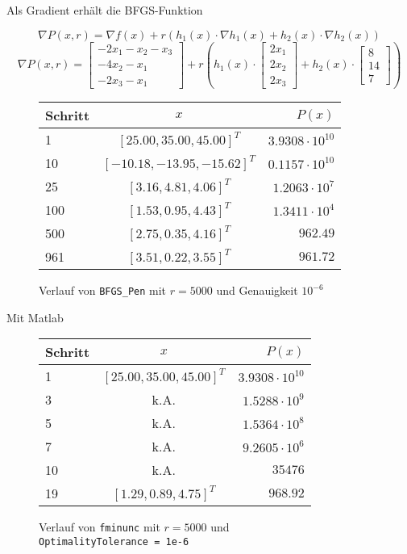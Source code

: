 \documentclass[a4paper, 12pt]{report}
\begin{document}
Als Gradient erhält die BFGS-Funktion

$$\nabla P(x, r) = \nabla f(x) + r\left(h_1(x)\cdot \nabla h_1(x) + h_2(x)\cdot \nabla h_2(x)\right)$$
$$\nabla P(x, r) = \begin{bmatrix}-2x_1 - x_2 - x_3\\-4x_2-x_1\\-2x_3-x_1\end{bmatrix} + r\left(h_1(x) \cdot \begin{bmatrix}2x_1\\2x_2\\2x_3\end{bmatrix} + h_2(x)\cdot \begin{bmatrix}8\\14\\7\end{bmatrix}\right)$$

\begin{figure}[H]
  \centering
  \def\arraystretch{1.25}
  \begin{tabular}{l|c|r}
    \hline
    \textbf{Schritt} & \textbf{$x$} & \textbf{$P(x)$}\\
    \hline
    1 & $[25.00, 35.00, 45.00]^T$ & $3.9308\cdot 10^{10}$\\
    10 & $[-10.18, -13.95, -15.62]^T$ & $0.1157\cdot 10^{10}$\\
    25 & $[3.16, 4.81, 4.06]^T$ & $1.2063 \cdot 10^7$\\
    100 & $[1.53, 0.95, 4.43]^T$ & $1.3411\cdot 10^4$\\
    500 & $[2.75, 0.35, 4.16]^T$ & $962.49$\\
    961 & $[3.51, 0.22, 3.55]^T$ & $961.72$\\
    \hline
  \end{tabular}
  \caption{Verlauf von \lstinline[basicstyle=\ttfamily\color{black}]|BFGS_Pen| mit $r = 5000$ und Genauigkeit $10^{-6}$}
\end{figure}

Mit Matlab

\begin{figure}[H]
  \centering
  \def\arraystretch{1.25}
  \begin{tabular}{l|c|r}
    \hline
    \textbf{Schritt} & \textbf{$x$} & \textbf{$P(x)$}\\
    \hline
    1 & $[25.00, 35.00, 45.00]^T$ & $3.9308\cdot 10^{10}$\\
    3 & k.A. & $1.5288\cdot 10^9$\\
    5 & k.A. & $1.5364\cdot 10^8$\\
    7 & k.A. & $9.2605\cdot 10^6$\\
    10 & k.A. & $35476$\\
    19 & $[1.29, 0.89, 4.75]^T$ & $968.92$\\
    \hline
  \end{tabular}
  \caption{Verlauf von \lstinline[basicstyle=\ttfamily\color{black}]|fminunc| mit $r = 5000$ und\\
  \lstinline[basicstyle=\ttfamily\color{black}]|OptimalityTolerance = 1e-6|}
\end{figure}
\end{document}
